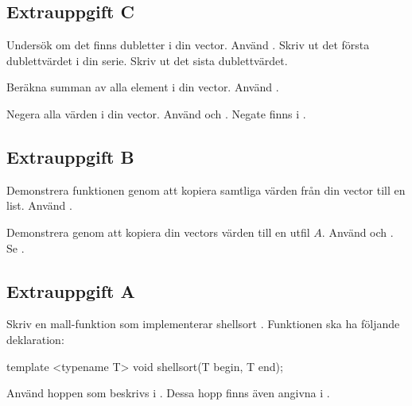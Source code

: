 \documentclass[a4paper]{miunasgn}
\begin{document}
\subsection{Extrauppgift C}
\noindent
Undersök om det finns dubletter i din vector. Använd .
Skriv ut det första dublettvärdet i din serie. Skriv ut det sista
dublettvärdet. 

Beräkna summan av alla element i din vector. Använd .

Negera alla värden i din vector. Använd  och .
Negate finns i .

\subsection{Extrauppgift B}
\noindent
Demonstrera funktionen  genom att kopiera samtliga värden
från din vector till en list. Använd .

Demonstrera  genom att kopiera din vectors värden till en utfil $A$. 
Använd  och . Se . 

\subsection{Extrauppgift A}
\noindent
Skriv en mall-funktion som implementerar shellsort \cite{Wikipedia2012s}.
Funktionen ska ha följande deklaration:
\begin{src}
template <typename T>
void shellsort(T begin, T end);
\end{src}
Använd hoppen som beskrivs i \cite{clura2001shellsortavg}.
Dessa hopp finns även angivna i \cite{Wikipedia2012s}.





\end{document}
